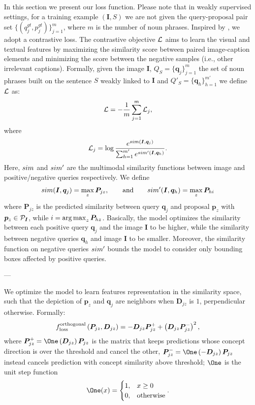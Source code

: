In this section we present our loss function. Please note that in
weakly supervised settings, for a training example $\left( \bm{I}, S
\right)$ we are not given the query-proposal pair set $\{ ( q^{gt}_j,
p^{gt}_j ) \}^m_{j=1}$, where $m$ is the number of noun phrases.
Inspired by \cite{wang2020maf}, we adopt a contrastive loss. The
contrastive objective $\mathcal{L}$ aims to learn the visual and textual
features by maximizing the similarity score between paired
image-caption elements and minimizing the score between the negative
samples (i.e., other irrelevant captions). Formally, given the image
$\bm{I}$, $Q_S = \{ \bm{q}_j \}^m_{j=1}$ the set of noun phrases built
on the sentence $S$ weakly linked to $\bm{I}$ and $Q'_S = \{ \bm{q}_h
\}^{m'}_{h=1}$ we define $\mathcal{L}$ as:
\begin{equation}
  \mathcal{L} = - \frac{1}{m} \sum^m_{j=1} \mathcal{L}_j,
\end{equation}
where
\begin{equation}
  \mathcal{L}_j = \log \frac{e^{sim(\bm{I}, \bm{q}_j)}}{\sum^{m'}_{h = 1} e^{sim'(\bm{I}, \bm{q}_{h})}}.
\end{equation}
Here, $sim$ and $sim'$ are the multimodal similarity functions
between image and positive/negative queries respectively. We define
\begin{equation}
  sim(\bm{I}, \bm{q}_j) = \max_{z} \bm{P}_{jz}, \qquad \text{and} \qquad sim'(\bm{I}, \bm{q}_h) = \max_z \bm{P}_{hi}
\end{equation}
where $\bm{P}_{jz}$ is the predicted similarity between query
$\bm{q}_j$ and proposal $\bm{p}_z$ with $\bm{p}_z \in \mathcal{P}_{\bm{I}}$,
while $i = \operatorname*{arg\,max}_z \bm{P}_{hz}$. Basically, the model optimizes the
similarity between each positive query $\bm{q}_j$ and the image
$\bm{I}$ to be higher, while the similarity between negative queries
$\bm{q}_h$ and image $\bm{I}$ to be smaller. Moreover, the similarity
function on negative queries $sim'$ bounds the model to consider
only bounding boxes affected by positive queries.

--- 

We optimize the model to learn features representation in the
similarity space, such that the depiction of $\bm{p}_z$ and $\bm{q}_j$
are neighbors when $\bm{D}_{jz}$ is $1$, perpendicular otherwise.
Formally:
\begin{equation}
  f_{\text{loss}}^{\text{orthogonal}} \left( \bm{P}_{jz}, \bm{D}_{jz} \right) = - \bm{D}_{jz} \bm{P}^+_{jz} + \left( \bm{D}_{jz} \bm{P}^-_{jz} \right)^2,
\end{equation}
where $\bm{P}^+_{jz} = \One\left( \bm{D}_{jz} \right) \bm{P}_{jz}$
is the matrix that keeps predictions whose concept direction is over
the threshold and cancel the other, $\bm{P}^-_{jz} = \One\left( -
\bm{D}_{jz} \right) \bm{P}_{jz}$ instead cancels prediction with
concept similarity above threshold; $\One$ is the unit step function
\begin{equation}
  \One(x) =
  \begin{cases}
    1, & x \geq 0 \\
    0, & \text{otherwise}
  \end{cases}.
\end{equation}

